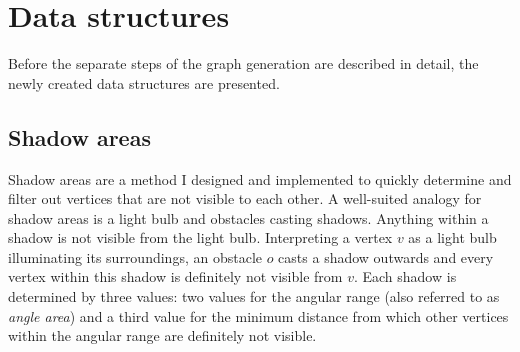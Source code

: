 \section{Data structures}
	
	Before the separate steps of the graph generation are described in detail, the newly created data structures are presented.
		
	\subsection{Shadow areas}
	\label{subsec:shadow-areas}
		
		Shadow areas are a method I designed and implemented to quickly determine and filter out vertices that are not visible to each other.
		A well-suited analogy for shadow areas is a light bulb and obstacles casting shadows.
		Anything within a shadow is not visible from the light bulb.
		Interpreting a vertex $v$ as a light bulb illuminating its surroundings, an obstacle $o$ casts a shadow outwards and every vertex within this shadow is definitely not visible from $v$.
		Each shadow is determined by three values:
		two values for the angular range (also referred to as \emph{angle area}) and a third value for the minimum distance from which other vertices within the angular range are definitely not visible.
		
